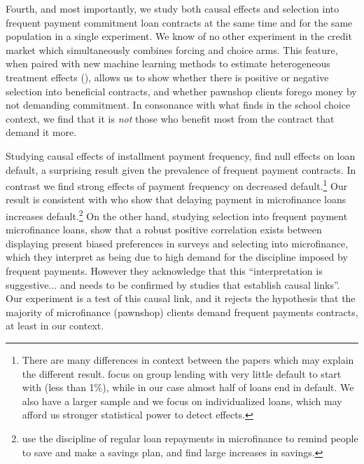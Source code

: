 \documentclass[oneside,11pt]{article}
\begin{document}
Fourth, and most importantly, we study both causal effects and selection into frequent payment commitment loan contracts at the same time and for the same population in a single experiment. We know of no other experiment in the credit market which simultaneously combines forcing and choice arms. This feature, when paired with new machine learning methods to estimate heterogeneous treatment effects (\cite{atheygrf}), allows us to show whether there is positive or negative selection into beneficial contracts, and whether pawnshop clients forego money by not demanding commitment. In consonance with what \cite{Walters} finds in the school choice context, we find that it is \textit{not}  those who benefit most from the contract that demand it more.  

Studying causal effects of installment payment frequency, \cite{Pande} find null effects on loan default, a surprising result given the prevalence of frequent payment contracts. In contrast we find strong effects of payment frequency on decreased default.\footnote{There are many differences in context between the papers which may explain the different result. \cite{Pande} focus on group lending with very little default to start with (less than 1\%), while in our case almost half of loans end in default. We also have a larger sample and we focus on individualized loans, which may afford us stronger statistical power to detect effects.} Our result is consistent with \cite{Field} who show that delaying payment in microfinance loans increases default.\footnote{\cite{Craig} use the discipline of regular loan repayments in microfinance to remind people to save and make a savings plan, and find large increases in savings.} On the other hand, studying selection into frequent payment microfinance loans, \cite{Murdoch} show that a robust positive correlation exists between displaying present biased preferences in surveys and selecting into microfinance, which they interpret as being due to high demand for the discipline imposed by frequent payments. However they acknowledge that this ``interpretation is suggestive... and needs to be confirmed by studies that establish causal links''. Our experiment is a test of this causal link, and it rejects the hypothesis that the majority of microfinance (pawnshop) clients demand frequent payments contracts, at least in our context. 



\end{document}
